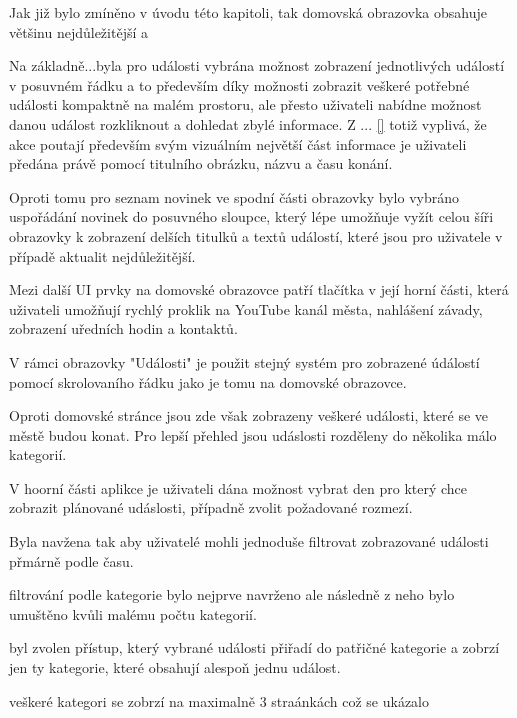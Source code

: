 \pagebreak
\begin{minipage}[t]{0.45\textwidth}
  Jak již bylo zmíněno v úvodu této kapitoli, tak domovská obrazovka obsahuje většinu nejdůležitější a 
  
  Na základně...byla pro události vybrána možnost zobrazení jednotlivých událostí v posuvném řádku a to především díky možnosti zobrazit
  veškeré potřebné události kompaktně na malém prostoru, ale přesto uživateli nabídne možnost danou událost rozkliknout a dohledat zbylé informace.
  Z ... \ref{} totiž vyplivá, že akce poutají především svým vizuálním největší část informace je uživateli předána právě pomocí titulního obrázku, názvu
  a času konání.
  
  Oproti tomu pro seznam novinek ve spodní části obrazovky bylo vybráno uspořádání novinek do posuvného sloupce, který lépe umožňuje 
  vyžít celou šíři obrazovky k zobrazení delších titulků a textů událostí, které jsou pro uživatele v případě aktualit nejdůležitější.
  
  Mezi další UI prvky na domovské obrazovce patří tlačítka v její horní části, která uživateli umožňují rychlý proklik na YouTube kanál města,
  nahlášení závady, zobrazení uředních hodin a kontaktů.
  
  
  
  \bigskip
  V rámci obrazovky "Události" je použit stejný systém pro zobrazené údálostí pomocí skrolovaního řádku jako je tomu na domovské obrazovce.
  
  Oproti domovské stránce jsou zde však zobrazeny veškeré události, které se ve městě budou konat. Pro lepší přehled jsou udáslosti rozděleny 
  do několika málo kategorií.
  
  V hoorní části aplikce je uživateli dána možnost vybrat den pro který chce zobrazit plánované udáslosti, případně zvolit požadované rozmezí.
  
  
  
  Byla navžena tak aby uživatelé mohli jednoduše filtrovat zobrazované události přmárně podle času.
  
  filtrování podle kategorie bylo nejprve navrženo ale následně z neho bylo umuštěno kvůli malému počtu kategorií.
  
  byl zvolen přístup, který vybrané události přiřadí do patřičné kategorie a zobrzí jen ty kategorie, které obsahují alespoň jednu událost.
  
  veškeré kategori se zobrzí na maximalně 3 straánkách což se ukázalo
\end{minipage}
